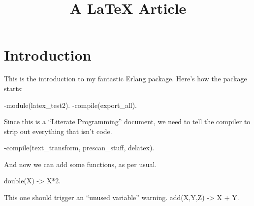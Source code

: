 \documentclass[]{article}
\title{A LaTeX Article}
\author{  }
\date{}
\newenvironment{code}{\footnotesize\verbatim}{\endverbatim\normalsize}
\begin{document}
\ifpdf
{}
\else
{}
\fi

\maketitle


\begin{abstract}
\end{abstract}

\section{Introduction}

This is the introduction to my fantastic Erlang package.  Here's how the package starts:

\begin{code}
	-module(latex_test2).
	-compile(export_all).
\end{code}

Since this is a ``Literate Programming'' document, we need to tell the compiler
to strip out everything that isn't code.

\begin{code}
	-compile({text_transform, prescan_stuff, delatex}).
\end{code}

And now we can add some functions, as per usual.

\begin{code}
	double(X) -> X*2.
\end{code}

This one should trigger an ``unused variable'' warning.
\begin{code}
	add(X,Y,Z) -> X + Y.
\end{code}








\end{document}
